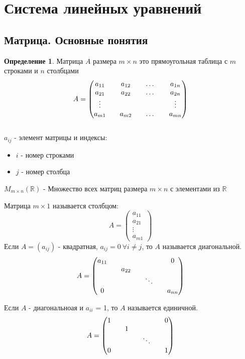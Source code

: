 \documentclass[a4paper, 12pt]{article}
\newcommand{\R}{\mathbb R}
\theoremstyle{definition}
\newtheorem*{definition}{Определение}
\begin{document}
  \section{Система линейных уравнений}
  \subsection{Матрица. Основные понятия}
  \begin{definition}
    Матрица $A$ размера $m\times n$ это прямоугольная таблица с $m$ строками и $n$ столбцами
    $$ A= \begin{pmatrix}
      a_{11} && a_{12} && \dots && a_{1n}\\
      a_{21} && a_{22} && \dots && a_{2n}\\
      \vdots && \null && \null && \vdots\\
      a_{m1} && a_{m2} && \dots && a_{mn}
    \end{pmatrix}$$ \\
    $a_{ij}$ - элемент матрицы и индексы:

    \begin{itemize}
      \item $i$ - номер строками
      \item $j$ - номер столбца
    \end{itemize}
    
    $M_{m\times n}(\R)$ - Множество всех матриц размера $m\times n$ с элементами из $\R$
    \end{definition}
    Матрица $m\times 1$ называется столбцом:
    $$ A= 
    \begin{pmatrix}
      a_{11} \\
      a_{21} \\
      \vdots \\
      a_{m1} 
    \end{pmatrix} $$
    Если $A=(a_{ij})$ - квадратная, $a_{ij} = 0\ \forall i \neq j$, то $A$ называется диагональной.
    $$ A =
    \begin{pmatrix}
      a_{11} && \null && \null && 0 \\
      \null && a_{22} && \null && \null \\
      \null && \null && \ddots && \null \\
      0 && \null && \null && a_{nn} 
    \end{pmatrix} $$

    Если $A$ - диагональноая и $a_{ii}$ = 1, то $A$ называется единичной.
    $$ A =
    \begin{pmatrix}
      1 && \null && \null && 0 \\
      \null && 1 && \null && \null \\
      \null && \null && \ddots && \null \\
      0 && \null && \null && 1 
    \end{pmatrix} $$
\end{document}
